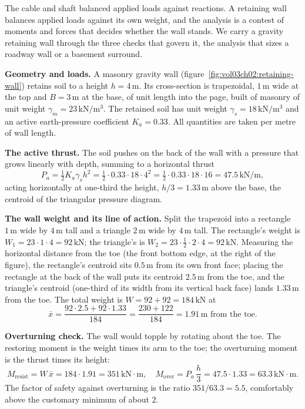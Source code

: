 The cable and shaft balanced applied loads against reactions. A retaining
wall balances applied loads against its own weight, and the analysis is a
contest of moments and forces that decides whether the wall stands. We carry
a gravity retaining wall through the three checks that govern it, the
analysis that sizes a roadway wall or a basement surround.

\textbf{Geometry and loads.} A masonry gravity wall
(figure~\ref{fig:vol03ch02:retaining-wall}) retains soil to a height
$h = 4\,\si{\meter}$. Its cross-section is trapezoidal, $1\,\si{\meter}$ wide
at the top and $B = 3\,\si{\meter}$ at the base, of unit length into the
page, built of masonry of unit weight $\gamma_m = 23\,\text{kN}/\text{m}^3$.
The retained soil has unit weight $\gamma_s = 18\,\text{kN}/\text{m}^3$ and
an active earth-pressure coefficient $K_a = 0.33$. All quantities are taken
per metre of wall length.



\textbf{The active thrust.} The soil pushes on the back of the wall with a
pressure that grows linearly with depth, summing to a horizontal thrust
\[
P_a = \tfrac12 K_a \gamma_s h^2
= \tfrac12 \cdot 0.33 \cdot 18 \cdot 4^2
= \tfrac12 \cdot 0.33 \cdot 18 \cdot 16 = 47.5\,\text{kN}/\text{m},
\]
acting horizontally at one-third the height, $h/3 = 1.33\,\si{\meter}$ above
the base, the centroid of the triangular pressure diagram.

\textbf{The wall weight and its line of action.} Split the trapezoid into a
rectangle $1\,\si{\meter}$ wide by $4\,\si{\meter}$ tall and a triangle
$2\,\si{\meter}$ wide by $4\,\si{\meter}$ tall. The rectangle's weight is
$W_1 = 23 \cdot 1 \cdot 4 = 92\,\text{kN}$; the triangle's is
$W_2 = 23 \cdot \tfrac12 \cdot 2 \cdot 4 = 92\,\text{kN}$. Measuring the
horizontal distance from the toe (the front bottom edge, at the right of the
figure), the rectangle's centroid sits $0.5\,\si{\meter}$ from its own
front face; placing the rectangle at the back of the wall puts its centroid
$2.5\,\si{\meter}$ from the toe, and the triangle's centroid (one-third of
its width from its vertical back face) lands $1.33\,\si{\meter}$ from the
toe. The total weight is $W = 92 + 92 = 184\,\text{kN}$ at
\[
\bar{x} = \frac{92 \cdot 2.5 + 92 \cdot 1.33}{184}
= \frac{230 + 122}{184} = 1.91\,\si{\meter} \text{ from the toe.}
\]

\textbf{Overturning check.} The wall would topple by rotating about the toe.
The restoring moment is the weight times its arm to the toe; the overturning
moment is the thrust times its height:
\[
M_{\text{resist}} = W\,\bar{x} = 184 \cdot 1.91 = 351\,\text{kN}\cdot\text{m},
\quad
M_{\text{over}} = P_a\,\frac{h}{3} = 47.5 \cdot 1.33 = 63.3\,\text{kN}\cdot\text{m}.
\]
The factor of safety against overturning is the ratio
$351 / 63.3 = 5.5$, comfortably above the customary minimum of about $2$.

